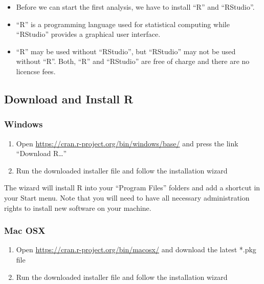 \documentclass[
]{book}
\providecommand{\tightlist}{%
  \setlength{\itemsep}{0pt}\setlength{\parskip}{0pt}}
\begin{document}
\begin{itemize}
\tightlist
\item
  Before we can start the first analysis, we have to install ``R'' and ``RStudio''.
\item
  ``R'' is a programming language used for statistical computing while ``RStudio'' provides a graphical user interface.
\item
  ``R'' may be used without ``RStudio'', but ``RStudio'' may not be used without ``R''. Both, ``R'' and ``RStudio'' are free of charge and there are no licencse fees.
\end{itemize}

\hypertarget{download-and-install-r}{%
\subsection{Download and Install R}\label{download-and-install-r}}

\hypertarget{windows}{%
\subsubsection{Windows}\label{windows}}

\begin{enumerate}
\def\labelenumi{\arabic{enumi}.}
\tightlist
\item
  Open \url{https://cran.r-project.org/bin/windows/base/} and press the link ``Download R\ldots{}''
\item
  Run the downloaded installer file and follow the installation wizard
\end{enumerate}

The wizard will install R into your ``Program Files'' folders and add a shortcut in your Start menu. Note that you will need to have all necessary administration rights to install new software on your machine.

\hypertarget{mac-osx}{%
\subsubsection{Mac OSX}\label{mac-osx}}

\begin{enumerate}
\def\labelenumi{\arabic{enumi}.}
\tightlist
\item
  Open \url{https://cran.r-project.org/bin/macosx/} and download the latest *.pkg file
\item
  Run the downloaded installer file and follow the installation wizard
\end{enumerate}
\end{document}
